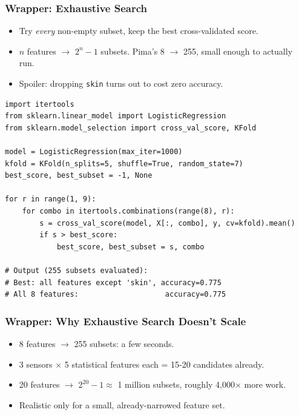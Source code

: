 \begin{frame}[fragile]\frametitle{Wrapper: Exhaustive Search}
\begin{itemize}
\item Try \emph{every} non-empty subset, keep the best cross-validated score.
\item $n$ features $\to$ $2^n - 1$ subsets. Pima's 8 $\to$ 255, small enough to actually run.
\item Spoiler: dropping \texttt{skin} turns out to cost zero accuracy.
\end{itemize}

\begin{lstlisting}
import itertools
from sklearn.linear_model import LogisticRegression
from sklearn.model_selection import cross_val_score, KFold

model = LogisticRegression(max_iter=1000)
kfold = KFold(n_splits=5, shuffle=True, random_state=7)
best_score, best_subset = -1, None

for r in range(1, 9):
    for combo in itertools.combinations(range(8), r):
        s = cross_val_score(model, X[:, combo], y, cv=kfold).mean()
        if s > best_score:
            best_score, best_subset = s, combo

# Output (255 subsets evaluated):
# Best: all features except 'skin', accuracy=0.775
# All 8 features:                    accuracy=0.775
\end{lstlisting}
\end{frame}

\begin{frame}[fragile]\frametitle{Wrapper: Why Exhaustive Search Doesn't Scale}
\begin{itemize}
\item 8 features $\to$ 255 subsets: a few seconds.
\item 3 sensors $\times$ 5 statistical features each = 15-20 candidates already.
\item 20 features $\to$ $2^{20}-1 \approx$ 1 million subsets, roughly 4{,}000$\times$ more work.
\item Realistic only for a small, already-narrowed feature set.
\end{itemize}
\end{frame}

